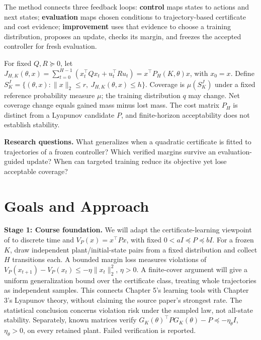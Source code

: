 \documentclass{l4dc2026}
\begin{document}
The method connects three feedback loops: \textbf{control} maps states to
actions and next states; \textbf{evaluation} maps chosen conditions to
trajectory-based certificate and cost evidence; \textbf{improvement} uses that
evidence to choose a training distribution, proposes an update, checks its
margin, and freezes the accepted controller for fresh evaluation.

For fixed $Q,R\succeq0$, let
$J_{H,K}(\theta,x)=\sum_{t=0}^{H-1}(x_t^\top Qx_t+u_t^\top Ru_t)
=x^\top P_H(K,\theta)x$, with $x_0=x$.
Define $S_K^J=\{(\theta,x):\|x\|_2\le r,\ J_{H,K}(\theta,x)\le h\}$.
Coverage is $\mu(S_K^J)$ under a fixed reference probability measure $\mu$;
the training distribution $q$ may change. Net coverage change equals gained
mass minus lost mass. The cost matrix $P_H$ is distinct from a Lyapunov
candidate $P$, and finite-horizon acceptability does not establish stability.

\textbf{Research questions.}
What generalizes when a quadratic certificate is fitted to trajectories of a
frozen controller? Which verified margins survive an evaluation-guided update?
When can targeted training reduce its objective yet lose acceptable coverage?

\section{Goals and Approach}

\textbf{Stage 1: Course foundation.}
We will adapt the certificate-learning viewpoint of \citet{boffi2021learning}
to discrete time and $V_P(x)=x^\top Px$, with fixed
$0<aI\preceq P\preceq bI$. For a frozen $K$, draw independent plant/initial-state
pairs from a fixed distribution and collect $H$ transitions each. A bounded
margin loss measures violations of
$V_P(x_{t+1})-V_P(x_t)\le-\eta\|x_t\|_2^2$, $\eta>0$.
A finite-cover argument will give a uniform generalization bound over the
certificate class, treating whole trajectories as independent samples.
This connects Chapter 5's learning tools with Chapter 3's Lyapunov theory,
without claiming the source paper's strongest rate.
The statistical conclusion concerns violation risk under the sampled law,
not all-state stability. Separately, known matrices verify
$G_K(\theta)^\top PG_K(\theta)-P\preceq-\eta_\theta I$, $\eta_\theta>0$,
on every retained plant. Failed verification is reported.
\end{document}
